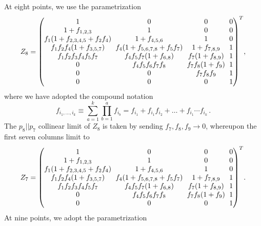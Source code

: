 \documentclass[11pt]{article}
\begin{document}
At eight points, we use the parametrization
\begin{equation} 
Z_{8} = 
\begingroup
\setlength\arraycolsep{3pt}
\begin{pmatrix} 
1 & 0 & 0 & 0 \\
1 + f_{1, 2, 3} & 1 & 0 & 0 \\
f_{1} (1 + f_{2,3,4,5} + f_2 f_{4}) & 1 + f_{4, 5, 6} & 1 & 0 \\ 
f_{1}f_{2}f_{4} (1 + f_{3,5,7}) & f_4 (1+ f_{5,6,7,8} + f_5 f_7) & 1+ f_{7,8,9} & 1 \\
f_{1}f_{2}f_{3}f_{4}f_{5}f_{7} & f_{4}f_{5}f_{7}(1+f_{6,8}) & f_7(1+f_{8,9}) & 1 \\ 
0 & f_{4}f_{5}f_{6}f_{7}f_{8} & f_{7}f_{8}(1+f_9) & 1 \\ 
0 & 0 & f_{7}f_{8}f_{9} & 1 \\ 
0 & 0 & 0 & 1
\end{pmatrix}^T \! ,
\endgroup 
\end{equation}
where we have adopted the compound notation 
\begin{equation} \label{eq:compound_x_def}
	f_{i_1,\ldots, i_k} \equiv \sum_{a=1}^k \prod_{b=1}^a f_{i_b} = f_{i_1}+f_{i_1}f_{i_2} + \ldots + f_{i_1}\cdots f_{i_k}\, .
\end{equation}
The $p_8 || p_7$ collinear limit of $Z_8$ is taken by sending $f_7, f_8, f_9 \to 0$, whereupon the first seven columns limit to   
\begin{equation} 
Z_{7} = 
\begingroup
\setlength\arraycolsep{3pt}
\begin{pmatrix} 
1 & 0 & 0 & 0 \\
1 + f_{1, 2, 3} & 1 & 0 & 0 \\
f_{1} (1 + f_{2,3,4,5} + f_2 f_{4}) & 1 + f_{4, 5, 6} & 1 & 0 \\ 
f_{1}f_{2}f_{4} (1 + f_{3,5,7}) & f_4 (1+ f_{5,6,7,8} + f_5 f_7) & 1+ f_{7,8,9} & 1 \\
f_{1}f_{2}f_{3}f_{4}f_{5}f_{7} & f_{4}f_{5}f_{7}(1+f_{6,8}) & f_7(1+f_{8,9}) & 1 \\ 
0 & f_{4}f_{5}f_{6}f_{7}f_{8} & f_{7}f_{8}(1+f_9) & 1 \\ 
0 & 0 & 0 & 1
\end{pmatrix}^T \! .
\endgroup 
\end{equation}
At nine points, we adopt the parametrization
\end{document}
